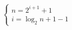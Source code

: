 \documentclass[preview]{standalone}
\begin{document}
\begin{align*}
\begin{cases} n = 2^{i + 1} + 1 \\i = \log_2{n + 1} - 1\end{cases}
\end{align*}
\end{document}
